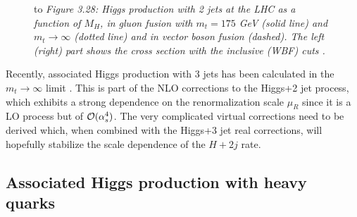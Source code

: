 \begin{figure}[h]
\hbox to
{\it Figure 3.28: Higgs production with 2 jets at the LHC as a function of
$M_H$, in gluon fusion with $m_t\!=\!175$ GeV (solid line) and $m_t\!\to\! 
\infty$ (dotted line) and in vector boson fusion (dashed). The left (right) 
part shows the cross section with the inclusive (WBF) cuts \cite{Vittorio}. }
\vspace*{-0.2cm}
\end{figure}

Recently, associated Higgs production with 3 jets has been calculated in the
$m_t \to \infty$ limit \cite{pp-ggHqqq}. This is part of the NLO corrections 
to the Higgs+2 jet process,  which exhibits a strong dependence on the
renormalization scale $\mu_R$ since it is a LO process but of ${\cal
O}(\alpha_s^4)$. The very complicated virtual corrections need to be derived
which, when combined with the Higgs+3 jet real corrections, will hopefully
stabilize the scale dependence of the $H+2j$ rate.


\subsection{Associated Higgs production with heavy quarks} 

